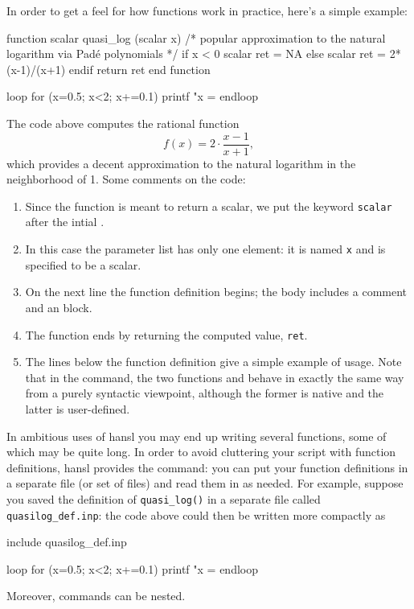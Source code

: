 In order to get a feel for how functions work in practice, here's a
simple example:
\begin{code}
function scalar quasi_log (scalar x)
   /* popular approximation to the natural logarithm
      via Padé polynomials
   */
   if x < 0
      scalar ret = NA
   else
      scalar ret = 2*(x-1)/(x+1)
   endif
   return ret
end function

loop for (x=0.5; x<2; x+=0.1)
   printf "x = %
endloop
\end{code}

The code above computes the rational function
\[
  f(x) = 2 \cdot \frac{x-1}{x+1} ,
\]
which provides a decent approximation to the natural logarithm in the
neighborhood of 1. Some comments on the code:

\begin{enumerate}
\item Since the function is meant to return a scalar, we put the
  keyword \texttt{scalar} after the intial .
\item In this case the parameter list has only one element: it is
  named \texttt{x} and is specified to be a scalar.
\item On the next line the function definition begins; the body
  includes a comment and an  block.
\item The function ends by returning the computed value, \texttt{ret}.
\item The lines below the function definition give a simple example of
  usage. Note that in the  command, the two functions
   and  behave in exactly the same way
  from a purely syntactic viewpoint, although the former is native and
  the latter is user-defined.
\end{enumerate}

In ambitious uses of hansl you may end up writing several functions,
some of which may be quite long. In order to avoid cluttering your
script with function definitions, hansl provides the 
command: you can put your function definitions in a separate file (or
set of files) and read them in as needed.  For example, suppose you
saved the definition of \verb|quasi_log()| in a separate file called
\verb|quasilog_def.inp|: the code above could then be written more
compactly as
\begin{code}
include quasilog_def.inp

loop for (x=0.5; x<2; x+=0.1)
   printf "x = %
endloop
\end{code}
Moreover,  commands can be nested.


